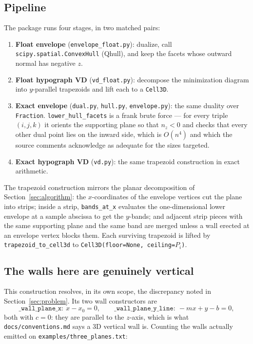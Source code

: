\documentclass[11pt]{article}
\begin{document}
\subsection{Pipeline}

The package runs four stages, in two matched pairs:

\begin{enumerate}
\item \textbf{Float envelope} (\texttt{envelope\_float.py}): dualize, call
  \texttt{scipy.spatial.ConvexHull} (Qhull), and keep the facets whose outward
  normal has negative $z$.
\item \textbf{Float hypograph VD} (\texttt{vd\_float.py}): decompose the
  minimization diagram into $y$-parallel trapezoids and lift each to a
  \texttt{Cell3D}.
\item \textbf{Exact envelope} (\texttt{dual.py}, \texttt{hull.py},
  \texttt{envelope.py}): the same duality over \texttt{Fraction}.
  \texttt{lower\_hull\_facets} is a frank brute force --- for every triple
  $(i,j,k)$ it orients the supporting plane so that $n_z < 0$ and checks that
  every other dual point lies on the inward side, which is $O(n^4)$ and which
  the source comments acknowledge as adequate for the sizes targeted.
\item \textbf{Exact hypograph VD} (\texttt{vd.py}): the same trapezoid
  construction in exact arithmetic.
\end{enumerate}

The trapezoid construction mirrors the planar decomposition of
Section~\ref{sec:algorithm}: the $x$-coordinates of the envelope vertices cut
the plane into strips; inside a strip, \texttt{bands\_at\_x} evaluates the
one-dimensional lower envelope at a sample abscissa to get the $y$-bands; and
adjacent strip pieces with the same supporting plane and the same band are
merged unless a wall erected at an envelope vertex blocks them.  Each surviving
trapezoid is lifted by \texttt{trapezoid\_to\_cell3d} to
\verb|Cell3D(floor=None, ceiling=|$P_i$\verb|)|.

\subsection{The walls here are genuinely vertical}
\label{sec:hypograph-walls}

This construction resolves, in its own scope, the discrepancy noted in
Section~\ref{sec:problem}.  Its two wall constructors are
\[
  \texttt{\_wall\_plane\_x}:\ x - x_0 = 0,
  \qquad
  \texttt{\_wall\_plane\_y\_line}:\ -m x + y - b = 0,
\]
both with $c = 0$: they are parallel to the $z$-axis, which is what
\texttt{docs/conventions.md} says a 3D vertical wall is.  Counting the walls
actually emitted on \texttt{examples/three\_planes.txt}:
\end{document}
